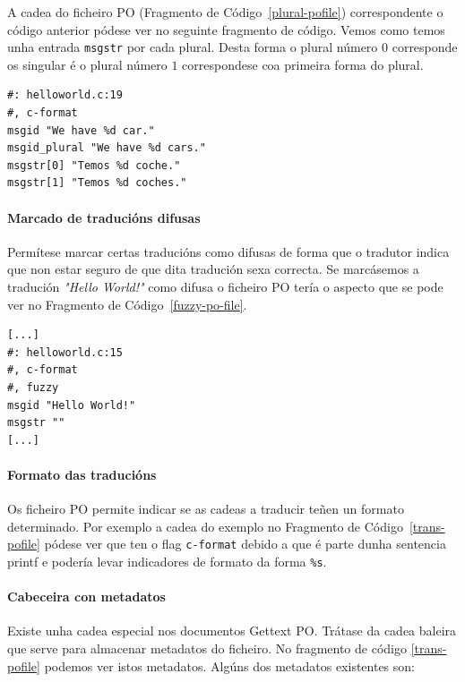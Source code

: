 A cadea do ficheiro PO (Fragmento de Código~\ref{plural-pofile}) correspondente o código anterior pódese ver no seguinte fragmento de código. Vemos como temos unha entrada \lstinline{msgstr} por cada plural. Desta forma o plural número $0$ corresponde os singular é o plural número $1$ correspondese coa primeira forma do plural.

\begin{lstlisting}[label=plural-pofile,caption=Plurais en GetText (Ficheiro PO).]
#: helloworld.c:19
#, c-format
msgid "We have %d car."
msgid_plural "We have %d cars."
msgstr[0] "Temos %d coche."
msgstr[1] "Temos %d coches."
\end{lstlisting}


\paragraph {Marcado de traducións difusas}
Permítese marcar certas traducións como difusas de forma que o tradutor indica que non estar seguro de que dita tradución sexa correcta. Se marcásemos a tradución \emph{"Hello World!"} como difusa o ficheiro PO tería o aspecto que se pode ver no Fragmento de Código~\ref{fuzzy-po-file}.

\begin{lstlisting}[label=fuzzy-po-file,caption=Ficheiro POT con comentario.]
[...]
#: helloworld.c:15
#, c-format
#, fuzzy
msgid "Hello World!"
msgstr ""
[...]
\end{lstlisting}

\paragraph {Formato das traducións}
Os ficheiro PO permite indicar se as cadeas a traducir teñen un formato determinado. Por exemplo a cadea do exemplo no Fragmento de Código~\ref{trans-pofile} pódese ver que ten o flag \lstinline{c-format} debido a que é parte dunha sentencia printf e podería levar indicadores de formato da forma \lstinline{%s}.

\paragraph {Cabeceira con metadatos}
Existe unha cadea especial nos documentos Gettext PO. Trátase da cadea baleira que serve para almacenar metadatos do ficheiro. No fragmento de código \ref{trans-pofile} podemos ver istos metadatos. Algúns dos metadatos existentes son:

